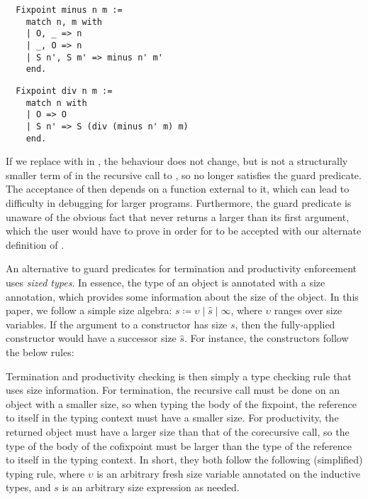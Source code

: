 \begin{multicols}{2}
\begin{verbatim}
  Fixpoint minus n m :=
    match n, m with
    | O, _ => n
    | _, O => n
    | S n', S m' => minus n' m'
    end.
  \end{verbatim}
  \begin{verbatim}
  Fixpoint div n m :=
    match n with
    | O => O
    | S n' => S (div (minus n' m) m)
    end.
  \end{verbatim}
\end{multicols}

If we replace  with  in , the behaviour does not change, but  is not a structurally smaller term of  in the recursive call to , so  no longer satisfies the guard predicate.
The acceptance of  then depends on a function external to it, which can lead to difficulty in debugging for larger programs.
Furthermore, the guard predicate is unaware of the obvious fact that  never returns a  larger than its first argument, which the user would have to prove in order for  to be accepted with our alternate definition of .

An alternative to guard predicates for termination and productivity enforcement uses \emph{sized types}. In essence, the \coinductive type of an object is annotated with a size annotation, which provides some information about the size of the object.
In this paper, we follow a simple size algebra: \mbox{$s \coloneqq \upsilon \mid \hat{s} \mid \infty$}, where $\upsilon$ ranges over size variables.
If the argument to a constructor has size $s$, then the fully-applied constructor would have a successor size $\hat{s}$.
For instance, the  constructors follow the below rules:

\vspace{-2ex}

Termination and productivity checking is then simply a type checking rule that uses size information. For termination, the recursive call must be done on an object with a smaller size, so when typing the body of the fixpoint, the reference to itself in the typing context must have a smaller size.
For productivity, the returned object must have a larger size than that of the corecursive call, so the type of the body of the cofixpoint must be larger than the type of the reference to itself in the typing context.
In short, they both follow the following (simplified) typing rule, where $\upsilon$ is an arbitrary fresh size variable annotated on the inductive types, and $s$ is an arbitrary size expression as needed.

